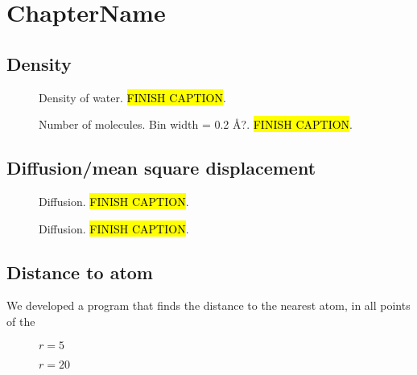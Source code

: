 \chapter{ChapterName}
\section{Density}
\begin{figure}[htpb]%
    \centering%
    \caption{%
        Density of water. \hl{FINISH CAPTION}. %
    }%
\end{figure}%
\begin{figure}[htpb]%
    \centering%
    \caption{%
        Number of molecules. Bin width = 0.2 \AA?. \hl{FINISH CAPTION}. %
    }%
\end{figure}%

\section{Diffusion/mean square displacement}
\begin{figure}[htpb]%
    \centering%
    {
        \newcommand{\f}{\footnotesize}
    }
    \caption{%
        Diffusion. \hl{FINISH CAPTION}. %
    }%
\end{figure}%

\begin{figure}[htpb]%
    \centering%
    \caption{%
        Diffusion. \hl{FINISH CAPTION}. %
    }%
\end{figure}%

\FloatBarrier
\section{Distance to atom}
We developed a program that finds the distance to the nearest atom, in all points of the 
%
\setlength{\myfigwidth}{0.90\textwidth}%
\begin{figure}[htpb]%
    \centering%
    \caption{$r = 5$ \Ang}%
    \label{fig:distance_to_atom_r05}%
\end{figure}%
%
\begin{figure}[htpb]%
    \centering%
    \caption{$r = 20$ \Ang}%
    \label{fig:distance_to_atom_r20}%
\end{figure}%

